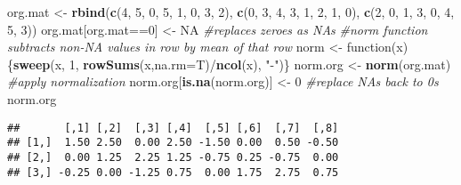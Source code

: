 \documentclass[]{article}
\newenvironment{Shaded}{\begin{snugshade}}{\end{snugshade}}
\newcommand{\KeywordTok}[1]{\textcolor[rgb]{0.13,0.29,0.53}{\textbf{{#1}}}}
\newcommand{\DataTypeTok}[1]{\textcolor[rgb]{0.13,0.29,0.53}{{#1}}}
\newcommand{\DecValTok}[1]{\textcolor[rgb]{0.00,0.00,0.81}{{#1}}}
\newcommand{\StringTok}[1]{\textcolor[rgb]{0.31,0.60,0.02}{{#1}}}
\newcommand{\CommentTok}[1]{\textcolor[rgb]{0.56,0.35,0.01}{\textit{{#1}}}}
\newcommand{\OtherTok}[1]{\textcolor[rgb]{0.56,0.35,0.01}{{#1}}}
\newcommand{\NormalTok}[1]{{#1}}
\begin{document}
\begin{Shaded}
\begin{Highlighting}[]
\NormalTok{org.mat <-}\StringTok{ }\KeywordTok{rbind}\NormalTok{(}\KeywordTok{c}\NormalTok{(}\DecValTok{4}\NormalTok{, }\DecValTok{5}\NormalTok{, }\DecValTok{0}\NormalTok{, }\DecValTok{5}\NormalTok{, }\DecValTok{1}\NormalTok{, }\DecValTok{0}\NormalTok{, }\DecValTok{3}\NormalTok{, }\DecValTok{2}\NormalTok{),}
                 \KeywordTok{c}\NormalTok{(}\DecValTok{0}\NormalTok{, }\DecValTok{3}\NormalTok{, }\DecValTok{4}\NormalTok{, }\DecValTok{3}\NormalTok{, }\DecValTok{1}\NormalTok{, }\DecValTok{2}\NormalTok{, }\DecValTok{1}\NormalTok{, }\DecValTok{0}\NormalTok{),}
                 \KeywordTok{c}\NormalTok{(}\DecValTok{2}\NormalTok{, }\DecValTok{0}\NormalTok{, }\DecValTok{1}\NormalTok{, }\DecValTok{3}\NormalTok{, }\DecValTok{0}\NormalTok{, }\DecValTok{4}\NormalTok{, }\DecValTok{5}\NormalTok{, }\DecValTok{3}\NormalTok{)) }
\NormalTok{org.mat[org.mat==}\DecValTok{0}\NormalTok{] <-}\StringTok{ }\OtherTok{NA} \CommentTok{#replaces zeroes as NAs}
\CommentTok{#norm function subtracts non-NA values in row by mean of that row}
\NormalTok{norm <-}\StringTok{ }\NormalTok{function(x) \{}\KeywordTok{sweep}\NormalTok{(x, }\DecValTok{1}\NormalTok{, }\KeywordTok{rowSums}\NormalTok{(x,}\DataTypeTok{na.rm=}\NormalTok{T)/}\KeywordTok{ncol}\NormalTok{(x), }\StringTok{"-"}\NormalTok{)\}}
\NormalTok{norm.org <-}\StringTok{ }\KeywordTok{norm}\NormalTok{(org.mat) }\CommentTok{#apply normalization}
\NormalTok{norm.org[}\KeywordTok{is.na}\NormalTok{(norm.org)] <-}\StringTok{ }\DecValTok{0} \CommentTok{#replace NAs back to 0s}
\NormalTok{norm.org}
\end{Highlighting}
\end{Shaded}

\begin{verbatim}
##       [,1] [,2]  [,3] [,4]  [,5] [,6]  [,7]  [,8]
## [1,]  1.50 2.50  0.00 2.50 -1.50 0.00  0.50 -0.50
## [2,]  0.00 1.25  2.25 1.25 -0.75 0.25 -0.75  0.00
## [3,] -0.25 0.00 -1.25 0.75  0.00 1.75  2.75  0.75
\end{verbatim}
\end{document}
